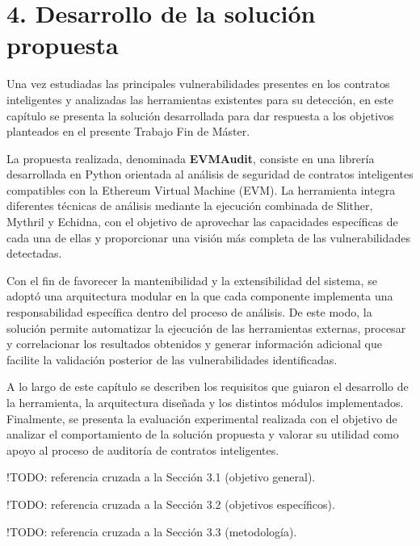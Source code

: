 \section{4. Desarrollo de la solución
propuesta}\label{desarrollo-de-la-soluciuxf3n-propuesta}

Una vez estudiadas las principales vulnerabilidades presentes en los
contratos inteligentes y analizadas las herramientas existentes para su
detección, en este capítulo se presenta la solución desarrollada para
dar respuesta a los objetivos planteados en el presente Trabajo Fin de
Máster.

La propuesta realizada, denominada \textbf{EVMAudit}, consiste en una
librería desarrollada en Python orientada al análisis de seguridad de
contratos inteligentes compatibles con la Ethereum Virtual Machine
(EVM). La herramienta integra diferentes técnicas de análisis mediante
la ejecución combinada de Slither, Mythril y Echidna, con el objetivo de
aprovechar las capacidades específicas de cada una de ellas y
proporcionar una visión más completa de las vulnerabilidades detectadas.

Con el fin de favorecer la mantenibilidad y la extensibilidad del
sistema, se adoptó una arquitectura modular en la que cada componente
implementa una responsabilidad específica dentro del proceso de
análisis. De este modo, la solución permite automatizar la ejecución de
las herramientas externas, procesar y correlacionar los resultados
obtenidos y generar información adicional que facilite la validación
posterior de las vulnerabilidades identificadas.

A lo largo de este capítulo se describen los requisitos que guiaron el
desarrollo de la herramienta, la arquitectura diseñada y los distintos
módulos implementados. Finalmente, se presenta la evaluación
experimental realizada con el objetivo de analizar el comportamiento de
la solución propuesta y valorar su utilidad como apoyo al proceso de
auditoría de contratos inteligentes.

!TODO: referencia cruzada a la Sección 3.1 (objetivo general).

!TODO: referencia cruzada a la Sección 3.2 (objetivos específicos).

!TODO: referencia cruzada a la Sección 3.3 (metodología).
